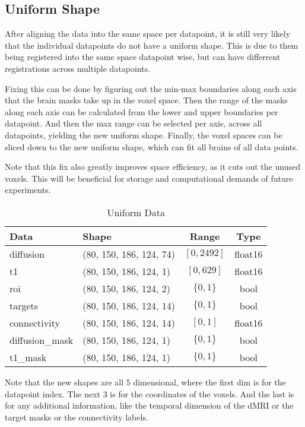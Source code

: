 \subsection{Uniform Shape}
After aligning the data into the same space per datapoint, it is still very likely that the individual datapoints do not have a uniform shape. This is due to them being registered into the same space datapoint wise, but can have differrent registrations across multiple datapoints.\par
Fixing this can be done by figuring out the min-max boundaries along each axis that the brain masks take up in the voxel space. Then the range of the masks along each axis can be calculated from the lower and upper boundaries per datapoint. And then the max range can be selected per axis, across all datapoints, yielding the new uniform shape. Finally, the voxel spaces can be sliced down to the new uniform shape, which can fit all brains of all data points.\par
Note that this fix also greatly improves space efficiency, as it cuts out the unused voxels. This will be beneficial for storage and computational demands of future experiments.
\begin{table}[H]
\centering
\begin{tabular}{|l|l|c|c|}
\hline
\textbf{Data} & \textbf{Shape} & \textbf{Range} & \textbf{Type} \\ \hline
diffusion & (80, 150, 186, 124, 74) & $[0,2492]$ & float16 \\ \hline
t1 & (80, 150, 186, 124, 1) & $[0,629]$ & float16 \\ \hline
roi & (80, 150, 186, 124, 2) & $\{0,1\}$ & bool \\ \hline
targets & (80, 150, 186, 124, 14) & $\{0,1\}$ & bool \\ \hline
connectivity & (80, 150, 186, 124, 14) & $[0,1]$ & float16 \\ \hline
diffusion\_mask & (80, 150, 186, 124, 1) & $\{0,1\}$ & bool \\ \hline
t1\_mask & (80, 150, 186, 124, 1) & $\{0,1\}$ & bool \\ \hline
\end{tabular}
\caption{Uniform Data}
\label{tab:datas2}
\end{table}
Note that the new shapes are all 5 dimensional, where the first dim is for the datapoint index. The next 3 is for the coordinates of the voxels. And the last is for any additional information, like the temporal dimension of the \ac{dMRI} or the target masks or the connectivity labels.

